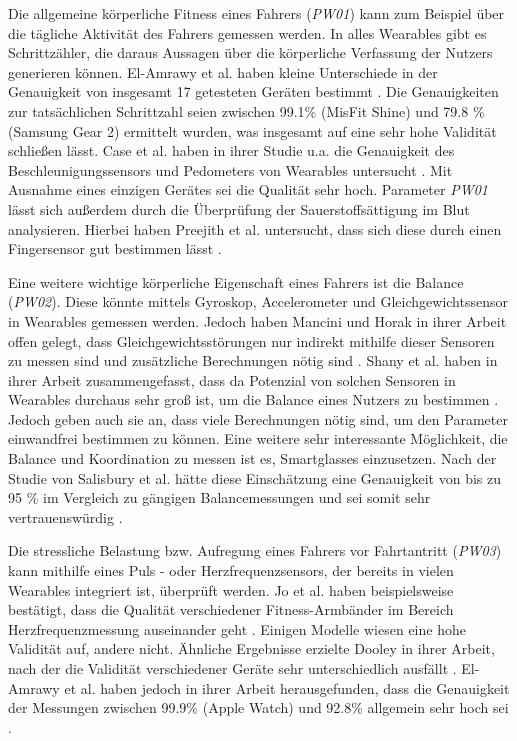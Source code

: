 Die allgemeine körperliche Fitness eines Fahrers (\textit{PW01}) kann zum Beispiel über die tägliche Aktivität des Fahrers gemessen werden. In alles Wearables gibt es Schrittzähler, die daraus Aussagen über die körperliche Verfassung der Nutzers generieren können.  El-Amrawy et al. haben kleine Unterschiede in der Genauigkeit von insgesamt 17 getesteten Geräten bestimmt \cite{wearabletracking}. Die Genauigkeiten zur tatsächlichen Schrittzahl seien zwischen 99.1\% (MisFit Shine) und 79.8 \%(Samsung Gear 2) ermittelt wurden, was insgesamt auf eine sehr hohe Validität schließen lässt. Case et al. haben in ihrer Studie u.a. die Genauigkeit des Beschleunigungssensors und Pedometers von Wearables untersucht \cite{studyaccuracysmartphoneapplications}. Mit Ausnahme eines einzigen Gerätes sei die Qualität sehr hoch. Parameter \textit{PW01} lässt sich außerdem durch die Überprüfung der Sauerstoffsättigung im Blut analysieren. Hierbei haben Preejith et al. untersucht, dass sich diese durch einen Fingersensor gut bestimmen lässt \cite{spo2oxygen}. 

Eine weitere wichtige körperliche Eigenschaft eines Fahrers ist die Balance (\textit{PW02}). Diese könnte mittels Gyroskop, Accelerometer und Gleichgewichtssensor in Wearables gemessen werden. Jedoch haben Mancini und Horak in ihrer Arbeit offen gelegt, dass Gleichgewichtsstörungen nur indirekt mithilfe dieser Sensoren zu messen sind und zusätzliche Berechnungen nötig sind \cite{balancewearables}. Shany et al. haben in ihrer Arbeit zusammengefasst, dass da Potenzial von solchen Sensoren in Wearables durchaus sehr groß ist, um die Balance eines Nutzers zu bestimmen \cite{sensorbasedfalls}. Jedoch geben auch sie an, dass viele Berechnungen nötig sind, um den Parameter einwandfrei bestimmen zu können. Eine weitere sehr interessante Möglichkeit, die Balance und Koordination zu messen ist es, Smartglasses einzusetzen. Nach der Studie von Salisbury et al. hätte diese Einschätzung eine Genauigkeit von bis zu 95 \% im Vergleich zu gängigen Balancemessungen und sei somit sehr vertrauenswürdig \cite{smartglasses}.

Die stressliche Belastung bzw. Aufregung eines Fahrers vor Fahrtantritt (\textit{PW03}) kann mithilfe eines Puls - oder Herzfrequenzsensors, der bereits in vielen Wearables integriert ist, überprüft werden. Jo et al. haben beispielsweise bestätigt, dass die Qualität verschiedener Fitness-Armbänder im Bereich Herzfrequenzmessung auseinander geht \cite{biofeedbackwearables}. Einigen Modelle wiesen eine hohe Validität auf, andere nicht. Ähnliche Ergebnisse erzielte Dooley in ihrer Arbeit, nach der die Validität verschiedener Geräte sehr unterschiedlich ausfällt \cite{selfmonitoringheartrate}. El-Amrawy et al. haben jedoch in ihrer Arbeit herausgefunden, dass die Genauigkeit der Messungen zwischen 99.9\% (Apple Watch) und 92.8\% allgemein sehr hoch sei \cite{wearabletracking}. 

